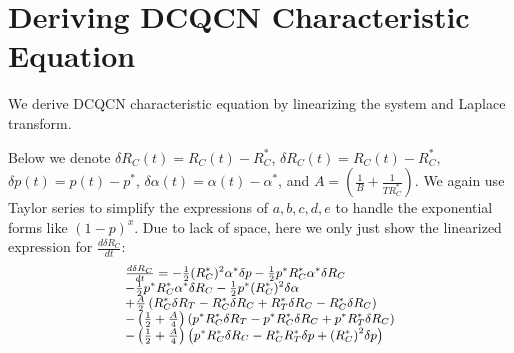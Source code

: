\appendix
\section{Deriving DCQCN Characteristic Equation}
\label{sec:dcqcn_stability_analysis}

We derive DCQCN characteristic equation by linearizing the system and Laplace transform.

Below we denote $\delta {R_C}(t) = {R_C}(t) - R_C^*$,
$\delta {R_C}(t) = {R_C}(t) - R_C^*$, $\delta p(t) = p(t) - p^*$, $\delta \alpha
(t) = \alpha (t) - \alpha^*$, and $A = \left( {\frac{1}{B} + \frac{1}{{TR_C^*}}}
\right)$.  We again use Taylor series to simplify the expressions of $a, b, c,
d, e$ to handle the exponential forms like $(1-p)^x$.  Due to lack of space,
here we only just show the linearized expression for $\frac{{d\delta {R_C}}}{{dt}}$:
\begin{equation}
\small
\begin{array}{l}
\frac{{d\delta {R_C}}}{{dt}} =  - \frac{1}{2}{(R_C^*)^2}{\alpha ^*}\delta p - \frac{1}{2}{p^*}R_C^*{\alpha ^*}\delta R_C \\
 - \frac{1}{2}{p^*}R_C^*{\alpha ^*}\delta {R_C} - \frac{1}{2}{p^*}{(R_C^*)^2}\delta \alpha \\
 + \frac{A}{2}\left( {R_C^*\delta {R_T} - R_C^*\delta {R_C} + R_T^*\delta {R_C} - R_C^*\delta R_C} \right)\\
 - \left( {\frac{1}{2} + \frac{A}{4}} \right)\left( {{p^*}R_C^*\delta {R_T} - {p^*}R_C^*\delta {R_C} + {p^*}R_T^*\delta {R_C}} \right)\\ 
 - \left( {\frac{1}{2} + \frac{A}{4}} \right)\left( {{p^*}R_C^*\delta R_C - R_C^*R_T^*\delta p + {{(R_C^*)}^2}\delta p} \right)
\end{array}
\end{equation}

